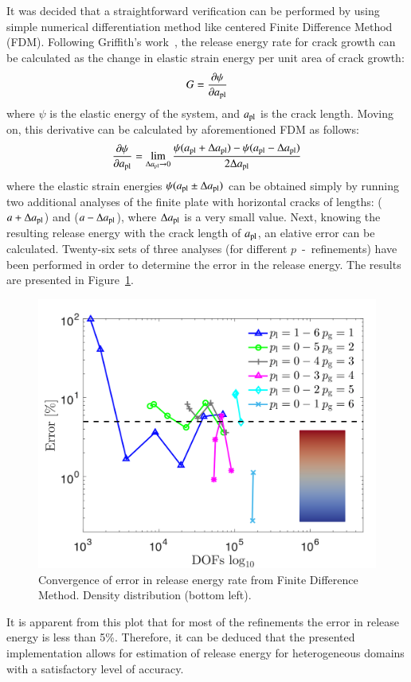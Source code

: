 \documentclass[11pt]{acmeArticle}
\numberwithin{equation}{section}
\begin{document}
It was decided that a straightforward verification can be performed by using simple numerical differentiation method like centered Finite Difference Method (FDM). Following Griffith's work~\citep{Griffith163}, the release energy rate for crack growth can be calculated as the change in elastic strain energy per unit area of crack growth:
\begin{equation}
G = \frac{\partial \psi}{\partial a_{\rm {pl}}}
\end{equation}
where $\psi$ is the elastic energy of the system, and $a_{\rm{pl}}$ is the crack length. Moving on, this derivative can be calculated by aforementioned FDM as follows:
\begin{equation}
 \frac{\partial \psi}{\partial a_{\rm {pl}}} = \lim_{\Delta a_{\rm {pl}} \to 0} \frac{\psi(a_{\rm {pl}} + \Delta a_{\rm {pl}}) - \psi(a_{\rm {pl}} -\Delta a_{\rm {pl}})}{2\Delta a_{\rm {pl}}}
\end{equation}
where the elastic strain energies $\psi(a_{\rm {pl}} \pm \Delta a_{\rm {pl}})$ can be obtained simply by running two additional analyses of the finite plate with horizontal cracks of lengths: ($a + \Delta a_{\rm {pl}}$) and ($a - \Delta a_{\rm {pl}}$), where $\Delta a_{\rm {pl}}$ is a very small value. 
Next, knowing the resulting release energy with the crack length of $a_{\rm {pl}}$, an elative error can be calculated. 
Twenty-six sets of three analyses (for different $p$~-~refinements) have been performed in order to determine the error in the release energy. 
The results are presented in Figure~\ref{fig:covergencefdm}.
\begin{figure}
	\centering
	\includegraphics[width=0.7\linewidth]{Figures/graphs/covergence_FDM.png}
	\caption{Convergence of error in release energy rate from Finite Difference Method. Density distribution (bottom left).}
	\label{fig:covergencefdm}
\end{figure}
It is apparent from this plot that for most of the refinements the error in release energy is less than 5\%.
Therefore, it can be deduced that the presented implementation allows for estimation of release energy for heterogeneous domains with a satisfactory level of accuracy.
\end{document}

